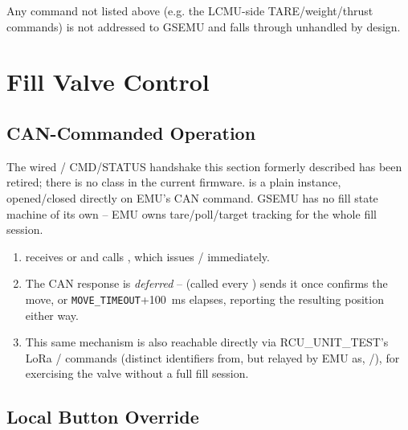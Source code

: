 ﻿\documentclass[11pt,letterpaper]{article}
\begin{document}
Any command not listed above (e.g. the LCMU-side TARE/weight/thrust
commands) is not addressed to GSEMU and falls through unhandled by design.

\section{Fill Valve Control}

\subsection{CAN-Commanded Operation}

The wired / CMD/STATUS handshake this
section formerly described has been retired; there is no 
class in the current firmware.  is a plain 
instance, opened/closed directly on EMU's CAN command. GSEMU has no fill
state machine of its own -- EMU owns tare/poll/target tracking for the
whole fill session.

\begin{sloppypar}
\begin{enumerate}[nosep]
  \item {} receives  or
         and calls ,
        which issues / immediately.
  \item The CAN response is \emph{deferred} -- 
        (called every ) sends it once 
        confirms the move, or \texttt{MOVE\_TIMEOUT}+100~ms elapses,
        reporting the resulting position either way.
  \item This same mechanism is also reachable directly via
        RCU\_UNIT\_TEST's LoRa /
        commands (distinct identifiers from, but relayed by EMU as,
        /), for
        exercising the valve without a full fill session.
\end{enumerate}
\end{sloppypar}

\subsection{Local Button Override}
\end{document}
